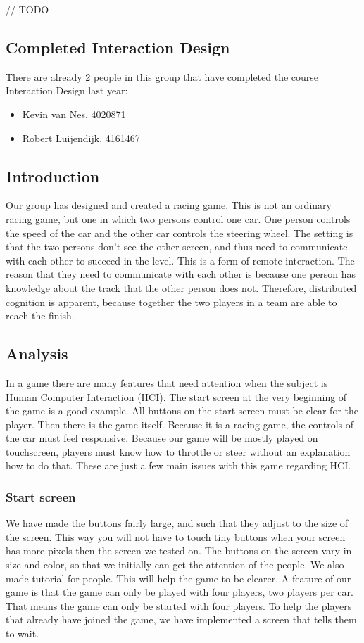 \documentclass[11pt,twoside,a4paper]{article}
\begin{document}
// TODO

\subsection{Completed Interaction Design}
There are already 2 people in this group that have completed the course Interaction Design last year:
\begin{itemize}
\item Kevin van Nes, 4020871
\item Robert Luijendijk, 4161467
\end{itemize}

\subsection{Introduction}
Our group has designed and created a racing game. This is not an ordinary racing game, but one in which two persons control one car. One person controls the speed of the car and the other car controls the steering wheel. The setting is that the two persons don't see the other screen, and thus need to communicate with each other to succeed in the level. This is a form of remote interaction. The reason that they need to communicate with each other is because one person has knowledge about the track that the other person does not. Therefore, distributed cognition is apparent, because together the two players in a team are able to reach the finish.

\subsection{Analysis}
In a game there are many features that need attention when the subject is Human Computer Interaction (HCI). The start screen at the very beginning of the game is a good example. All buttons on the start screen must be clear for the player. Then there is the game itself. Because it is a racing game, the controls of the car must feel responsive. Because our game will be mostly played on touchscreen, players must know how to throttle or steer without an explanation how to do that. These are just a few main issues with this game regarding HCI.

\subsubsection{Start screen}
We have made the buttons fairly large, and such that they adjust to the size of the screen. This way you will not have to touch tiny buttons when your screen has more pixels then the screen we tested on. The buttons on the screen vary in size and color, so that we initially can get the attention of the people. We also made tutorial for people. This will help the game to be clearer. A feature of our game is that the game can only be played with four players, two players per car. That means the game can only be started with four players. To help the players that already have joined the game, we have implemented a screen that tells them to wait.
\end{document}
